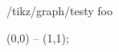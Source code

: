 \documentclass[a4paper]{ltxdoc}
\begin{document}
\begin{key}{/tikz/graph/testy}
  foo
\end{key}

\tikzset{/tikz/testy/.style=}
\tikzset{/tikz/graph/testy/.style=}

\begin{codeexample}[]
  
\tikz {} (0,0) -- (1,1);
\end{codeexample}
\end{document}

